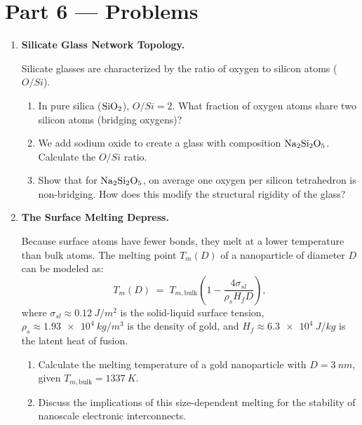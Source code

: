 \documentclass[12pt, a4paper]{book}
\begin{document}
\newpage

\section{Part 6 --- Problems}

\begin{problembox}
\begin{enumerate}[label=\textbf{P\arabic*.}]
  \item \textbf{Silicate Glass Network Topology.}
  
        Silicate glasses are characterized by the ratio of oxygen to silicon atoms ($O/Si$).
        \begin{enumerate}[label=(\alph*)]
          \item In pure silica ($\ce{SiO2}$), $O/Si = 2$. What fraction of oxygen atoms share two silicon atoms (bridging oxygens)?
          \item We add sodium oxide to create a glass with composition $\ce{Na2Si2O5}$. Calculate the $O/Si$ ratio.
          \item Show that for $\ce{Na2Si2O5}$, on average one oxygen per silicon tetrahedron is non-bridging. How does this modify the structural rigidity of the glass?
        \end{enumerate}

  \item \textbf{The Surface Melting Depress.}
  
        Because surface atoms have fewer bonds, they melt at a lower temperature than bulk atoms. The melting point $T_m(D)$ of a nanoparticle of diameter $D$ can be modeled as:
        \[
          T_m(D) \;=\; T_{m,\text{bulk}} \left(1 - \frac{4\sigma_{sl}}{\rho_s H_f D}\right),
        \]
        where $\sigma_{sl} \approx \SI{0.12}{J/m^2}$ is the solid-liquid surface tension, $\rho_s \approx \SI{1.93e4}{kg/m^3}$ is the density of gold, and $H_f \approx \SI{6.3e4}{J/kg}$ is the latent heat of fusion.
        \begin{enumerate}[label=(\alph*)]
          \item Calculate the melting temperature of a gold nanoparticle with $D = \SI{3}{nm}$, given $T_{m,\text{bulk}} = \SI{1337}{K}$.
          \item Discuss the implications of this size-dependent melting for the stability of nanoscale electronic interconnects.
        \end{enumerate}
\end{enumerate}
\end{problembox}
\end{document}

